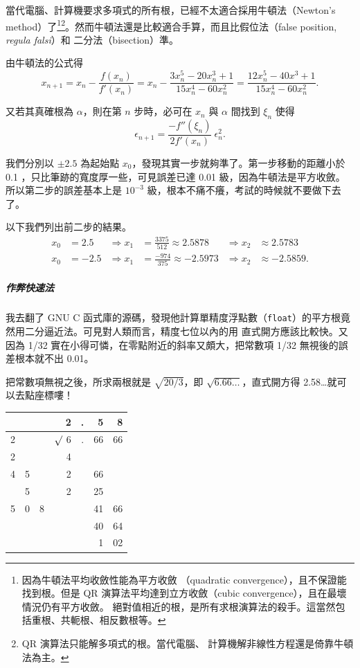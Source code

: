 \documentclass[a4paper,12pt]{article}
\begin{document}
\begin{CJK}{UTF8}{bsmi}
當代電腦、計算機要求多項式的所有根，已經不太適合採用牛頓法（Newton's method）了\footnote{因為牛頓法平均收斂性能為平方收斂%
（quadratic convergence），且不保證能找到根。但是 QR 演算法平均達到立方收斂（cubic convergence），且在最壞情況仍有平方收斂。%
絕對值相近的根，是所有求根演算法的殺手。這當然包括重根、共軛根、相反數根等。}\footnote{QR 演算法只能解多項式的根。當代電腦、%
計算機解非線性方程還是倚靠牛頓法為主。}。然而牛頓法還是比較適合手算，而且比假位法（false position, \textit{regula falsi}）和%
二分法（bisection）準。

由牛頓法的公式得
\[x_{n+1} = x_n - \frac{f(x_n)}{f'(x_n)}
          = x_n - \frac{3x_n^5 - 20x_n^3 + 1}{15x_n^4 - 60x_n^2}
	  = \frac{12x_n^5 - 40x^3 + 1}{15x_n^4 - 60x_n^2}.\]

又若其真確根為 $\alpha$，則在第 $n$ 步時，必可在 $x_n$ 與 $\alpha$ 間找到 $\xi_n$ 使得
\[\epsilon_{n+1} = \frac{-f''(\xi_n)}{2f'(x_n)}\:\epsilon_n^2.\]

我們分別以 $\pm 2.5$ 為起始點 $x_0$，發現其實一步就夠準了。第一步移動的距離小於 0.1 ，只比筆跡的寬度厚一些，可見誤差已達 0.01
級，因為牛頓法是平方收斂。所以第二步的誤差基本上是 $10^{-3}$ 級，根本不痛不癢，考試的時候就不要做下去了。

以下我們列出前二步的結果。
\[\begin{aligned}
x_0 &=  2.5 &\Rightarrow x_1 &= \frac{3375}{512} \approx  2.5878 &\Rightarrow x_2 &\approx  2.5783\\
x_0 &= -2.5 &\Rightarrow x_1 &= \frac{-974}{375} \approx -2.5973 &\Rightarrow x_2 &\approx -2.5859.
\end{aligned}\]

\subparagraph{作弊快速法}
我去翻了 GNU C 函式庫的源碼，發現他計算單精度浮點數（\verb|float|）的平方根竟然用二分逼近法。可見對人類而言，精度七位以內的用%
直式開方應該比較快。又因為 1/32 實在小得可憐，在零點附近的斜率又頗大，把常數項 1/32 無視後的誤差根本就不出 0.01。

把常數項無視之後，所求兩根就是 $\sqrt{20/3}$，即 $\sqrt{6.66\dots}$，直式開方得 2.58\dots 就可以去點座標嘍！

\begin{center}
\begin{tabular}{c@{}c@{}c r@{}r@{}r@{\,}r}
 & & &        2&.& 5& 8\\
\hline
2& & &$\surd$ 6&.&66&66\\
2& & &        4& &  &  \\
\hline
4&5& &        2& &66&  \\
 &5& &        2& &25&  \\
\hline
5&0&8&         & &41&66\\
 & & &         & &40&64\\
\hline
 & & &         & & 1&02
\end{tabular}
\end{center}


\end{CJK}
\end{document}
